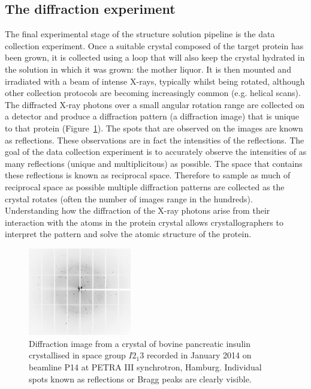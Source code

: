     \subsection{The diffraction experiment}
    \label{sub:The diffraction experiment}
        The final experimental stage of the structure solution pipeline is the data collection experiment.
        Once a suitable crystal composed of the target protein has been grown, it is collected using a loop that will also keep the crystal hydrated in the solution in which it was grown: the mother liquor.
        It is then mounted and irradiated with a beam of intense X-rays, typically whilst being rotated, although other collection protocols are becoming increasingly common (e.g. helical scans).
        The diffracted X-ray photons over a small angular rotation range are collected on a detector and produce a diffraction pattern (a diffraction image) that is unique to that protein (Figure~\ref{fig:Insulin diffraction image}).
        The spots that are observed on the images are known as reflections. These observations are in fact the intensities of the reflections.
        The goal of the data collection experiment is to accurately observe the intensities of as many reflections (unique and multiplicitous) as possible.
        The space that contains these reflections is known as reciprocal space. Therefore to sample as much of reciprocal space as possible multiple diffraction patterns are collected as the crystal rotates (often the number of images range in the hundreds).
        Understanding how the diffraction of the X-ray photons arise from their interaction with the atoms in the protein crystal allows crystallographers to interpret the pattern and solve the atomic structure of the protein.
        \begin{figure}
            \centering
            \includegraphics[width=0.4\textwidth]{figures/introduction/InsulinDiffractionImage.png}
            \caption{Diffraction image from a crystal of bovine pancreatic insulin crystallised in space group $I2_1 3$ recorded in January 2014 on beamline P14 at PETRA III synchrotron, Hamburg. Individual spots known as reflections or Bragg peaks are clearly visible.}
            \label{fig:Insulin diffraction image}
        \end{figure}

